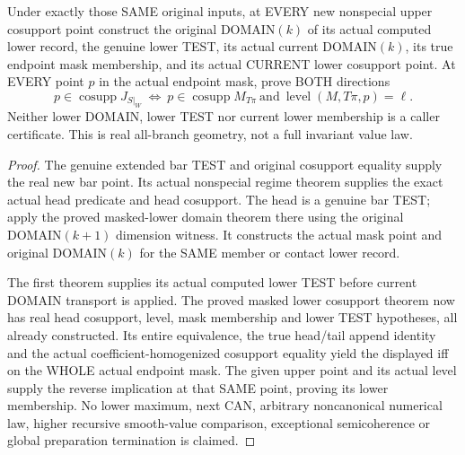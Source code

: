 \begin{theorem}
\label{hir:original-prepared-current-all-branches-lower-domain-point}
\leanok
Under exactly those SAME original inputs, at EVERY new nonspecial upper
cosupport point construct the original DOMAIN$(k)$ of its actual computed
lower record, the genuine lower TEST, its actual current DOMAIN$(k)$,
its true endpoint mask membership, and its actual CURRENT lower cosupport
point. At EVERY point $p$ in the actual endpoint mask, prove BOTH directions
\[
 p\in\operatorname{cosupp}J_{S|_W}\ \Longleftrightarrow\
 p\in\operatorname{cosupp}M_{T\pi}\ \text{and}\
 \operatorname{level}(M,T\pi,p)=\ell.
\]
Neither lower DOMAIN, lower TEST nor current lower membership is a caller
certificate. This is real all-branch geometry, not a full invariant value law.
\end{theorem}
\begin{proof}
The genuine extended bar TEST and original cosupport equality supply the
real new bar point. Its actual nonspecial regime theorem supplies the exact
actual head predicate and head cosupport. The head is a genuine bar TEST;
apply the proved masked-lower domain theorem there using the original
DOMAIN$(k+1)$ dimension witness. It constructs the actual mask point and
original DOMAIN$(k)$ for the SAME member or contact lower record.

The first theorem supplies its actual computed lower TEST before current
DOMAIN transport is applied. The proved masked lower cosupport theorem now
has real head cosupport, level, mask membership and lower TEST hypotheses,
all already constructed. Its entire equivalence, the true head/tail append
identity and the actual coefficient-homogenized cosupport equality yield the
displayed iff on the WHOLE actual endpoint mask. The given upper point and
its actual level supply the reverse implication at that SAME point, proving
its lower membership. No lower maximum, next CAN, arbitrary noncanonical
numerical law, higher recursive smooth-value comparison, exceptional
semicoherence or global preparation termination is claimed.
\end{proof}
